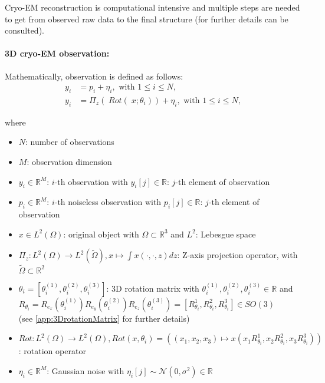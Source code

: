 Cryo-EM reconstruction is computational intensive and multiple steps are needed to get from observed
raw data to the final structure (for further details \cite{singleParticleCryoEm} can be consulted).


\paragraph{3D cryo-EM observation:}
Mathematically, observation is defined as follows:
\begin{equation}
    \label{eq:cryoEmSimple}
    \begin{aligned}
        y_i &= p_i + \eta_i, \text{ with } 1 \leq i \leq N,\\
        y_i &= \Pi_z  (\; Rot (\;x; \theta_i )) + \eta_i, \text{ with } 1 \leq i \leq N,    
    \end{aligned}
\end{equation}

where 
\begin{itemize}
    \item $N$: number of observations
    \item $M$: observation dimension
    \item $y_i \in \mathbb{R}^M$:  $i$-th observation with $y_i[j] \in \mathbb{R}$: $j$-th element of observation
    \item $p_i \in \mathbb{R}^M$:  $i$-th noiseless observation with $p_i[j] \in \mathbb{R}$: $j$-th element of observation
    \item $x \in L^2(\Omega)$: original object with $\Omega \subset \mathbb{R}^3 $ and $L^2$: Lebesgue space
    \item $\Pi_z : L^2(\Omega) \to L^2(\tilde{\Omega}), x \mapsto  \int x(\cdot,\cdot,z) dz$: Z-axis projection operator,
          with $\tilde{\Omega} \subset \mathbb{R}^2$
    \item $\theta_i = [\theta_i^{(1)}, \theta_i^{(2)}, \theta_i^{(3)} ] $: 3D rotation matrix with $ \theta_i^{(1)}, \theta_i^{(2)}, \theta_i^{(3)} \in \mathbb{R}$ and \\
          $R_{\theta_i} =  R_{e_x} (\theta_i^{(1)}) R_{e_y} (\theta_i^{(2)}) R_{e_z} (\theta_i^{(3)}) = [R^1_{\theta_i}, R^2_{\theta_i}, R^3_{\theta_i}] \in SO(3)$ \\
          (see \ref{app:3DrotationMatrix} for further details)
    \item $\textit{Rot} : L^2(\Omega) \to L^2(\Omega), \textit{Rot}(x, \theta_i) = \left((x_1,x_2,x_3) \mapsto x( x_1R^1_{\theta_i}, x_2R^2_{\theta_i}, x_3R^3_{\theta_i})\right)$: rotation operator
    \item $\eta_i \in \mathbb{R}^M$: Gaussian noise with $\eta_i[j] \sim \mathcal{N}(0,\sigma^2) \in \mathbb{R}$
\end{itemize}

